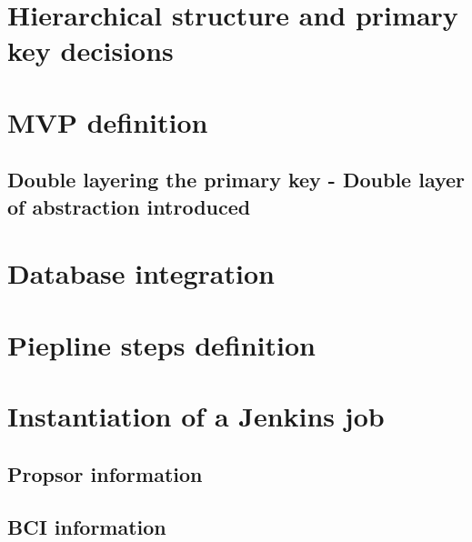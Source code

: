 \documentclass[../main.tex]{subfiles}
\begin{document}
\section{Hierarchical structure and primary key decisions}
\section{MVP definition}
\subsection{Double layering the primary key - Double layer of abstraction introduced}
\section{Database integration}
\section{Piepline steps definition}
\section{Instantiation of a Jenkins job}
\subsection{Propsor information}
\subsection{BCI information}
\cleardoublepage
\end{document}
